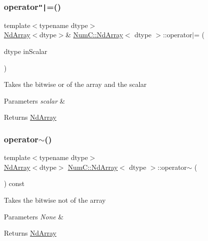 \subsubsection{\texorpdfstring{operator\texttt{"|}=()}{operator|=()}\hspace{0.1cm}{\footnotesize\ttfamily [2/2]}}
{\footnotesize\ttfamily template$<$typename dtype$>$ \\
\mbox{\hyperlink{class_num_c_1_1_nd_array}{Nd\+Array}}$<$dtype$>$\& \mbox{\hyperlink{class_num_c_1_1_nd_array}{Num\+C\+::\+Nd\+Array}}$<$ dtype $>$\+::operator$\vert$= (\begin{DoxyParamCaption}\item[{dtype}]{in\+Scalar }\end{DoxyParamCaption})\hspace{0.3cm}{\ttfamily [inline]}}

Takes the bitwise or of the array and the scalar


\begin{DoxyParams}{Parameters}
{\em scalar} & \\
\hline
\end{DoxyParams}
\begin{DoxyReturn}{Returns}
\mbox{\hyperlink{class_num_c_1_1_nd_array}{Nd\+Array}} 
\end{DoxyReturn}
\mbox{\label{class_num_c_1_1_nd_array_a9d84b394bbbe64d9e05f6e2246f83bee}} 
\subsubsection{\texorpdfstring{operator$\sim$()}{operator~()}}
{\footnotesize\ttfamily template$<$typename dtype$>$ \\
\mbox{\hyperlink{class_num_c_1_1_nd_array}{Nd\+Array}}$<$dtype$>$ \mbox{\hyperlink{class_num_c_1_1_nd_array}{Num\+C\+::\+Nd\+Array}}$<$ dtype $>$\+::operator$\sim$ (\begin{DoxyParamCaption}{ }\end{DoxyParamCaption}) const\hspace{0.3cm}{\ttfamily [inline]}}

Takes the bitwise not of the array


\begin{DoxyParams}{Parameters}
{\em None} & \\
\hline
\end{DoxyParams}
\begin{DoxyReturn}{Returns}
\mbox{\hyperlink{class_num_c_1_1_nd_array}{Nd\+Array}} 
\end{DoxyReturn}
\mbox{\label{class_num_c_1_1_nd_array_aff67329d4dc3c27b160649ead4e1f30e}} 
